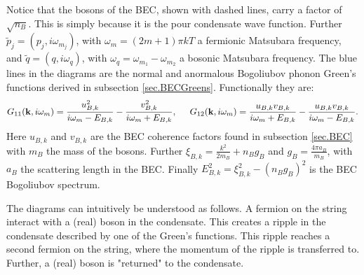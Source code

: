 Notice that the bosons of the BEC, shown with dashed lines, carry a factor of $\sqrt{n_B}$. This is simply because it is the pour condensate wave function. Further $\tilde{p}_j = (p_j, i\omega_{m_j})$, with $\omega_{m} = (2m+1)\pi kT$ a fermionic Matsubara frequency, and $\tilde{q} = (q, i\omega_q )$, with $\omega_q = \omega_{m_1}-\omega_{m_2}$ a bosonic Matsubara frequency. The blue lines in the diagrams are the normal and anormalous Bogoliubov phonon Green's functions derived in subsection \ref{sec.BECGreens}. Functionally they are:
\begin{equation}
G_{11}(\mathbf{k},i\omega_m) = \frac{u_{B,k}^2}{i\omega_m-E_{B,k}}-\frac{v_{B,k}^2}{i\omega_m+E_{B,k}}, \hspace{0.5cm} G_{12}(\mathbf{k},i\omega_m) = \frac{u_{B,k}v_{B,k}}{i\omega_m+E_{B,k}}-\frac{u_{B,k}v_{B,k}}{i\omega_m-E_{B,k}}.\nonumber
\end{equation}
Here $u_{B,k}$ and $v_{B,k}$ are the BEC coherence factors found in subsection \ref{sec.BEC} with $m_B$ the mass of the bosons. Further $\xi_{B,k} = \frac{k^2}{2m_B}+n_Bg_B$ and $g_B = \frac{4\pi a_B}{m_B}$, with $a_B$ the scattering length in the BEC. Finally $E_{B,k}^2 = \xi_{B,k}^2-(n_Bg_B)^2$ is the BEC Bogoliubov spectrum.

The diagrams can intuitively be understood as follows. A fermion on the string interact with a (real) boson in the condensate. This creates a ripple in the condensate described by one of the Green's functions. This ripple reaches a second fermion on the string, where the momentum of the ripple is transferred to. Further, a (real) boson is "returned" to the condensate. 

